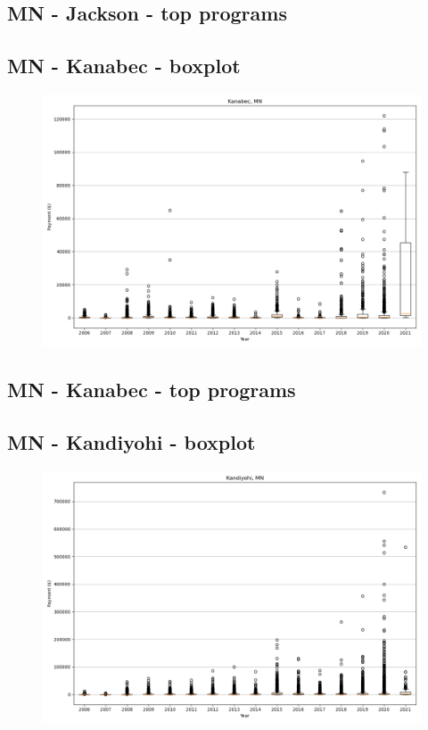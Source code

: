 \subsection*{MN - Jackson - top programs}

\newpage
\subsection*{MN - Kanabec - boxplot}
\begin{figure}[h]
\centering
\includegraphics[width=7in]{../output/boxplots/counties/Kanabec-MN_boxplot.png}
\end{figure}


\subsection*{MN - Kanabec - top programs}

\newpage
\subsection*{MN - Kandiyohi - boxplot}
\begin{figure}[h]
\centering
\includegraphics[width=7in]{../output/boxplots/counties/Kandiyohi-MN_boxplot.png}
\end{figure}



